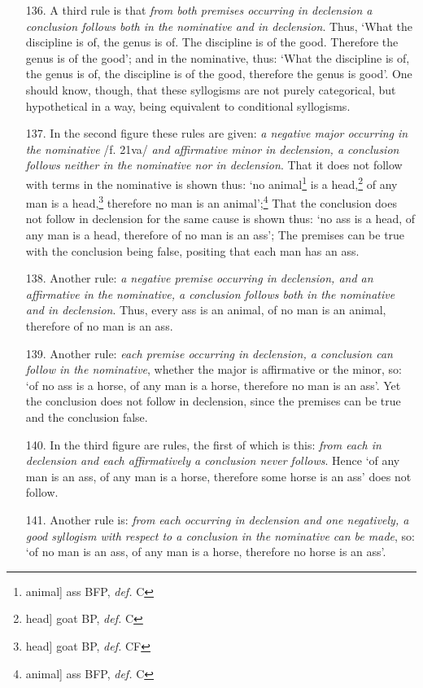 \begin{itemize}
\item[136.] A third rule is that \textit{from both premises occurring in declension a conclusion follows both in the nominative and in declension}. Thus, `What the discipline is of, the genus is of. The discipline is of the good. Therefore the genus is of the good'; and in the nominative, thus: `What the discipline is of, the genus is of, the discipline is of the good, therefore the genus is good'. One should know, though, that these syllogisms are not purely categorical, but hypothetical in a way, being equivalent to conditional syllogisms.
\item[137.] In the second figure these rules are given: \textit{a negative major occurring in the nominative} /f. 21va/ \textit{and affirmative minor in declension, a conclusion follows neither in the nominative nor in declension}. That it does not follow with terms in the nominative is shown thus: `no animal\footnote{animal] ass BFP, \textit{def.} C} is a head,\footnote{head] goat BP, \textit{def.} C} of any man is a head,\footnote{head] goat BP, \textit{def.} CF} therefore no man is an animal';\footnote{animal] ass BFP, \textit{def.} C} That the conclusion does not follow in declension for the same cause is shown thus: `no ass is a head, of any man is a head, therefore of no man is an ass'; The premises can be true with the conclusion being false, positing that each man has an ass.
\item[138.] Another rule: \textit{a negative premise occurring in declension, and an affirmative in the nominative, a conclusion follows both in the nominative and in declension}. Thus, every ass is an animal, of no man is an animal, therefore of no man is an ass.
\item[139.] Another rule: \textit{each premise occurring in declension, a conclusion can follow in the nominative}, whether the major is affirmative or the minor, so: `of no ass is a horse, of any man is a horse, therefore no man is an ass'. Yet the conclusion does not follow in declension, since the premises can be true and the conclusion false.
\item[140.] In the third figure are rules, the first of which is this: \textit{from each in declension and each affirmatively a conclusion never follows}. Hence `of any man is an ass, of any man is a horse, therefore some horse is an ass' does not follow. 
\item[141.] Another rule is: \textit{from each occurring in declension and one negatively, a good syllogism with respect to a conclusion in the nominative can be made}, so: `of no man is an ass, of any man is a horse, therefore no horse is an ass'.

\end{itemize}
